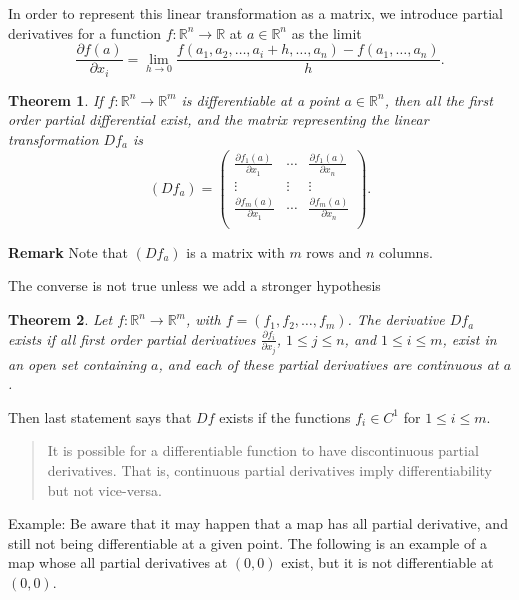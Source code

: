 \documentclass{amsart}
\newtheorem{thm}{Theorem}
\begin{document}
In order to represent this linear transformation as a matrix, we introduce partial derivatives for a function \(f: \mathbb{R}^n \to \mathbb{R}\) at \(a \in \mathbb{R}^n\) as the limit
\[ \frac{\partial f(a)}{\partial x_i} = \lim_{h\to 0} \frac{f(a_1,a_2,\ldots, a_i + h, \ldots, a_n) - f(a_1,\ldots, a_n)}{h}.\]


\begin{thm}
If \(f:\mathbb{R}^n \to \mathbb{R}^m\) is differentiable at a point \(a\in \mathbb{R}^n\), then all the first order partial differential exist, and the matrix representing the linear transformation \(Df_a\) is 
\[ (Df_a) = \left( \begin{array}{ccc}
\frac{\partial f_1(a)}{\partial x_1} & \cdots & \frac{\partial f_1(a)}{\partial x_n}\\
\vdots & \vdots & \vdots  \\
\frac{\partial f_m(a)}{\partial x_1} & \cdots & \frac{\partial f_m(a)}{\partial x_n}\\
\end{array} \right). \]
\end{thm}

\textbf{Remark} Note that \((Df_a)\)  is a matrix with \(m\) rows and \(n\) columns.

The converse is not true unless we add a stronger hypothesis 

\begin{thm}
Let \(f:\mathbb{R}^n \to \mathbb{R}^m\), with \(f= (f_1,f_2,\ldots,f_m)\). The derivative  \(Df_a\) exists if all first order partial derivatives \(\frac{\partial f_i}{\partial x_j}\), \(1\leq j \leq n\), and \(1\leq i \leq m\), exist in an open set containing \(a\), and each of these partial derivatives are continuous at \(a\).
\end{thm}

Then last statement says that \(Df\) exists if the functions \(f_i \in C^{1}\) for \(1\leq i \leq m\).

\begin{quote}
It is possible for a differentiable function to have discontinuous partial derivatives. That is, continuous partial derivatives imply differentiability but not vice-versa.
\end{quote}

Example: Be aware that it may happen that a map has all partial derivative, and still not being differentiable at a given point. The following is an example of a map whose all
partial derivatives at \((0,0)\) exist, but it is not differentiable at \((0,0)\).
\end{document}
